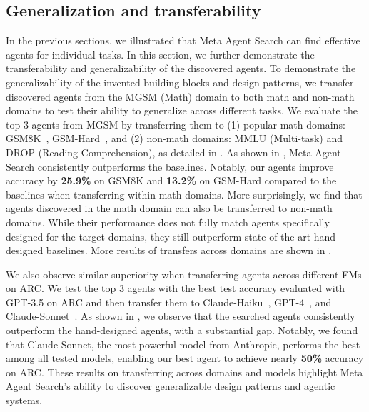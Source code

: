 \documentclass{article}
\newcommand{\ouralgo}{Meta Agent Search\xspace}
\begin{document}
\subsection{Generalization and transferability}

\label{section:expr_generalization}
In the previous sections, we illustrated that \ouralgo can find effective agents for individual tasks.
In this section, we further demonstrate the transferability and generalizability of the discovered agents.
To demonstrate the generalizability of the invented building blocks and design patterns, we transfer discovered agents from the MGSM (Math) domain to both math and non-math domains to test their ability to generalize across different tasks. We evaluate the top 3 agents from MGSM by transferring them to (1) popular math domains: GSM8K~\citep{cobbe2021gsm8k}, GSM-Hard~\citep{gao2023gsmhard}, and (2) non-math domains: MMLU (Multi-task) and DROP (Reading Comprehension), as detailed in . As shown in , \ouralgo consistently outperforms the baselines. Notably, our agents improve accuracy by \textbf{25.9\%} on GSM8K and \textbf{13.2\%} on GSM-Hard compared to the baselines when transferring within math domains. More surprisingly, we find that agents discovered in the math domain can also be transferred to non-math domains. While their performance does not fully match agents specifically designed for the target domains, they still outperform state-of-the-art hand-designed baselines. More results of transfers across domains are shown in .

We also observe similar superiority when transferring agents across different FMs on ARC. We test the top 3 agents with the best test accuracy evaluated with GPT-3.5 on ARC and then transfer them to Claude-Haiku~\citep{anthropic_2024_claude3}, GPT-4~\citep{openai2024gpt4}, and Claude-Sonnet~\citep{anthropic_claude3.5}. As shown in , we observe that the searched agents consistently outperform the hand-designed agents, with a substantial gap. Notably, we found that Claude-Sonnet, the most powerful model from Anthropic, performs the best among all tested models, enabling our best agent to achieve nearly \textbf{50\%} accuracy on ARC. These results on transferring across domains and models highlight \ouralgo’s ability to discover generalizable design patterns and agentic systems.  
\end{document}

